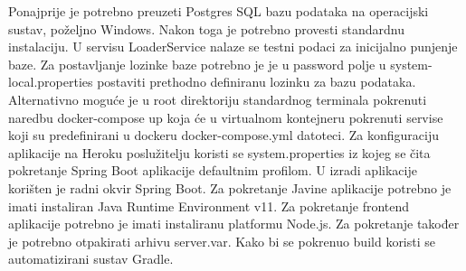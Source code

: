 			
			Ponajprije je potrebno preuzeti Postgres SQL bazu podataka na operacijski sustav, poželjno Windows. Nakon toga je potrebno provesti standardnu instalaciju. U servisu LoaderService nalaze se testni podaci za inicijalno punjenje baze. Za postavljanje lozinke baze potrebno je je u password polje u system-local.properties postaviti prethodno definiranu lozinku za bazu podataka. Alternativno moguće je u root direktoriju standardnog terminala  pokrenuti naredbu docker-compose up koja će u virtualnom kontejneru pokrenuti servise koji su predefinirani u dockeru docker-compose.yml datoteci. Za konfiguraciju aplikacije na Heroku poslužitelju koristi se system.properties iz kojeg se čita pokretanje Spring Boot aplikacije defaultnim profilom.
			U izradi aplikacije korišten je radni okvir Spring Boot. Za pokretanje Javine aplikacije
			potrebno je imati instaliran Java Runtime Environment v11. Za pokretanje frontend aplikacije
			potrebno je imati instaliranu platformu Node.js. Za pokretanje također je potrebno otpakirati 
			arhivu server.var. Kako bi se pokrenuo build koristi se automatizirani sustav Gradle. 
			
			\eject 